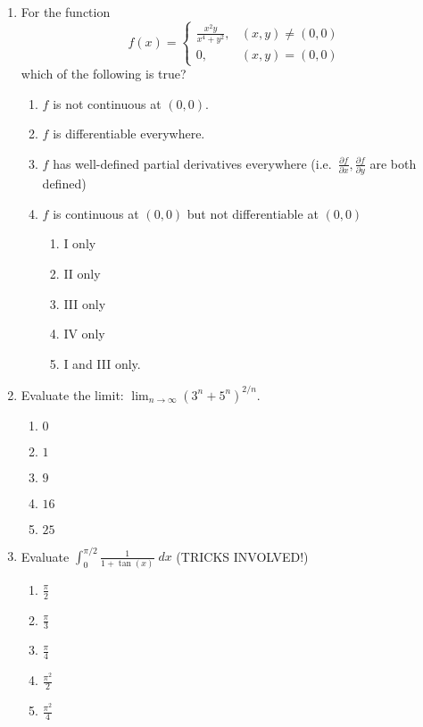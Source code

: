 \documentclass[letterpaper, 12pt]{amsart}
\begin{document}
\begin{enumerate}[leftmargin=*,itemsep=0.5cm]
 \item For the function
 \[
  f(x)=\begin{cases}
          \frac{x^2y}{x^4+y^2}, &(x,y)\not=(0,0) \\
          0, & (x,y)=(0,0)
       \end{cases}
 \] which of the following is true?
  
 \vspace*{0.15cm}
 \begin{enumerate}[itemsep=0.15cm,label=\Roman*]
   \item $f$ is not continuous at $(0,0)$.
   \item $f$ is differentiable everywhere.
   \item $f$ has well-defined partial derivatives everywhere 
         (i.e.~$\frac{\partial f}{\partial x}, \frac{\partial f}{\partial y}$
         are both defined)
   \item $f$ is continuous at $(0,0)$ but not differentiable at $(0,0)$
   
    
 \vspace*{0.15cm}
 \begin{enumerate}[itemsep=0.15cm]
   \item I only
   \item II only
   \item III only
   \item IV only
   \item I and III only.
  \end{enumerate}
  \end{enumerate}  
  
  \item Evaluate the limit: $\displaystyle \lim_{n\to\infty}\left(3^n+5^n\right)^{2/n}$.
    \vspace*{0.15cm}
 \begin{enumerate}[itemsep=0.15cm]
   \item $0$
   \item $1$
   \item $9$
   \item $16$
   \item $25$
  \end{enumerate}
  
 \item Evaluate $\displaystyle \int_0^{\pi/2} \frac{1}{1+\tan(x)}\;dx$ (TRICKS INVOLVED!)
  
  \vspace*{0.15cm}
 \begin{enumerate}[itemsep=0.15cm]
   \item $\frac{\pi}{2}$
   \item $\frac{\pi}{3}$
   \item $\frac{\pi}{4}$
   \item $\frac{\pi^2}{2}$
   \item $\frac{\pi^2}{4}$
  \end{enumerate}
  

\end{enumerate}
\end{document}
